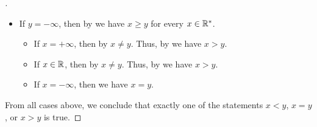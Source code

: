 \begin{proof}[]
\begin{itemize}
          \begin{itemize}
            \item If \(x = +\infty\), then we have \(x = y\).
            \item If \(x \in \R\), then by  \(x \neq y\).
                  Thus, by  we have \(x < y\).
            \item If \(x = -\infty\), then by  \(x \neq y\).
                  Thus, by  we have \(x < y\).
          \end{itemize}
    \item If \(y = -\infty\), then by  we have \(x \geq y\) for every \(x \in \mathbb{R}^*\).
          \begin{itemize}
            \item If \(x = +\infty\), then by  \(x \neq y\).
                  Thus, by  we have \(x > y\).
            \item If \(x \in \R\), then by  \(x \neq y\).
                  Thus, by  we have \(x > y\).
            \item If \(x = -\infty\), then we have \(x = y\).
          \end{itemize}
  \end{itemize}
  From all cases above, we conclude that exactly one of the statements \(x < y\), \(x = y\), or \(x > y\) is true.
\end{proof}


